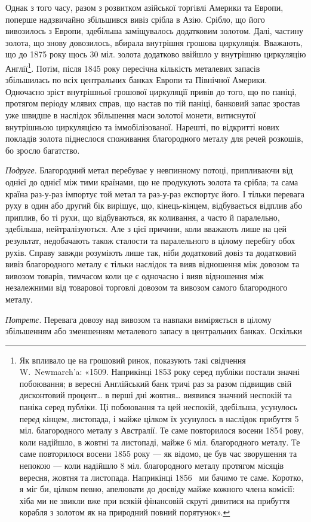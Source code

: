 Однак з того часу, разом з розвитком азійської торгівлі Америки та Европи,
поперше надзвичайно збільшився вивіз срібла в Азію. Срібло, що його вивозилось
з Европи, здебільша заміщувалось додатковим золотом. Далі, частину золота,
що знову довозилось, вбирала внутрішня грошова циркуляція. Вважають, що до
1875 року щось 30 міл. золота додатково ввійшло у внутрішню циркуляцію Англії\footnote{Як впливало це на грошовий ринок, показують такі свідчення W.~Newmarch’a: «1509.
Наприкінці 1853 року серед публіки постали значні побоювання; в вересні Англійський банк тричі
раз за разом підвищив свій дисконтовий процент\dots{} в перші дні жовтня\dots{} виявився значний неспокій
та паніка серед публіки. Ці побоювання та цей неспокій, здебільша, усунулось перед кінцем,
листопада, і майже цілком їх усунулось в наслідок прибуття 5 міл. благородного металу з Австралії.
Те саме повторилося восени 1854 рову, коли надійшло, в жовтні та листопаді, майже 6 міл.
благородного металу. Те саме повторилося восени 1855 року — як відомо, це був час зворушення та
непокою — коли надійшло 8 міл. благородного металу протягом місяців вересня, жовтня та листопада.
Наприкінці 1856~ ми бачимо те саме. Коротко, я міг би, цілком певно, апелювати до досвіду майже
кожного члена комісії: хіба ми не звикли вже при всякій фінансовій скруті дивитися на прибуття
корабля з золотом як на природний повний порятунок».}.
Потім, після 1845 року пересічна кількість металевих запасів збільшилась по всіх
центральних банках Европи та Північної Америки. Одночасно зріст внутрішньої
грошової циркуляції привів до того, що по паніці, протягом періоду млявих
справ, що настав по тій паніці, банковий запас зростав уже швидше в наслідок
збільшення маси золотої монети, витиснутої внутрішньою циркуляцією та іммобілізованої.
Нарешті, по відкритті нових покладів золота піднеслося споживання
благородного металу для речей розкошів, бо зросло багатство.

\emph{Подруге}. Благородний метал перебуває у невпинному потоці, припливаючи
від однієї до однієї між тими країнами, що не продукують золота та
срібла; та сама країна раз-у-раз імпортує той метал та раз-у-раз експортує
його. І тільки перевага руху в один або другий бік вирішує, що, кінець-кінцем,
відбувається відплив або приплив, бо ті рухи, що відбуваються, як коливання,
а часто й паралельно, здебільша, нейтралізуються. Але з цієї причини,
коли вважають лише на цей результат, недобачають також сталости та паралельного
в цілому перебігу обох рухів. Справу завжди розуміють лише так, ніби
додатковий довіз та додатковий вивіз благородного металу є тільки наслідок та
вияв відношення між довозом та вивозом товарів, тимчасом коли це є одночасно
і вияв відношення між незалежними від товарової торговлі довозом та вивозом
самого благородного металу.

\emph{Потретє}. Перевага довозу над вивозом та навпаки виміряється в цілому
збільшенням або зменшенням металевого запасу в центральних банках. Оскільки
\parbreak{}  %
